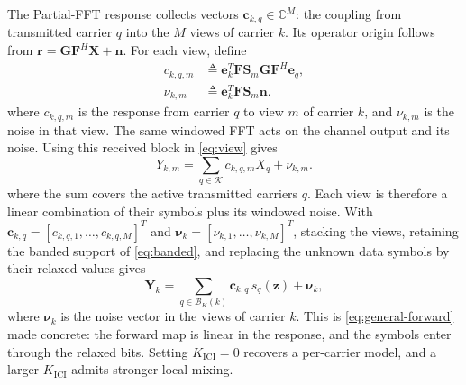 \documentclass[conference]{IEEEtran}
\newcommand{\C}{\mathbb{C}}
\newcommand{\Kset}{\mathcal{K}}
\begin{document}
The Partial-FFT response collects vectors \(\mathbf c_{k,q}\in\C^M\): the
coupling from transmitted carrier \(q\) into the \(M\) views of carrier
\(k\).  Its operator origin follows from
\(\mathbf r=\mathbf G\mathbf F^H\mathbf X+\mathbf n\).  For each view, define
\begin{align}
  c_{k,q,m}
  &\triangleq
  \mathbf e_k^T\mathbf F\mathbf S_m
  \mathbf G\mathbf F^H\mathbf e_q,
  \label{eq:view-response-operator}\\
  \nu_{k,m}
  &\triangleq
  \mathbf e_k^T\mathbf F\mathbf S_m\mathbf n .
  \label{eq:view-noise}
\end{align}
where \(c_{k,q,m}\) is the response from carrier \(q\) to view \(m\) of
carrier \(k\), and \(\nu_{k,m}\) is the noise in that view.  The same
windowed FFT acts on the channel output and its noise.
Using this received block in \eqref{eq:view} gives
\begin{equation}
  Y_{k,m}
  =
  \sum_{q\in\Kset}c_{k,q,m}X_q+\nu_{k,m}.
  \label{eq:view-forward-component}
\end{equation}
where the sum covers the active transmitted carriers \(q\).  Each view is
therefore a linear combination of their symbols plus its windowed noise.
With
\(\mathbf c_{k,q}=[c_{k,q,1},\ldots,c_{k,q,M}]^T\) and
\(\bm\nu_k=[\nu_{k,1},\ldots,\nu_{k,M}]^T\), stacking the views, retaining the
banded support of \eqref{eq:banded}, and replacing the unknown data symbols by
their relaxed values gives
\begin{equation}
  \mathbf Y_k
  =
  \sum_{q\in\mathcal B_K(k)}
  \mathbf c_{k,q}\,s_q(\mathbf z)
  +\bm\nu_k,
  \label{eq:view-forward}
\end{equation}
where \(\bm\nu_k\) is the noise vector in the views of carrier \(k\).  This is
\eqref{eq:general-forward} made concrete: the forward map is linear in the
response, and the symbols enter through the relaxed bits.  Setting
\(K_{\mathrm{ICI}}=0\) recovers a per-carrier model, and a larger
\(K_{\mathrm{ICI}}\) admits stronger local mixing.
\end{document}
